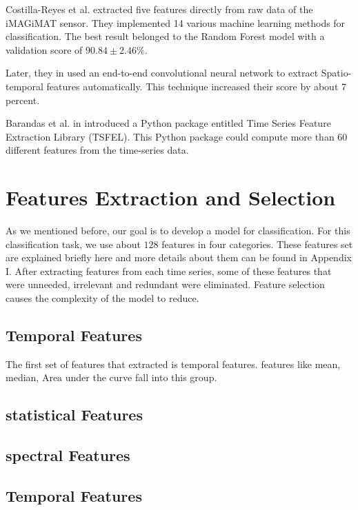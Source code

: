 Costilla-Reyes et al. \cite{Costilla-Reyes2016TemporalSystem} extracted five features directly from raw data of the iMAGiMAT sensor. They implemented 14 various machine learning methods for classification. The best result belonged to the Random Forest model with a validation score of $90.84 \pm 2.46\%$. 

Later, they in \cite{Costilla-Reyes2018DeepSensors} used an end-to-end convolutional neural network to extract Spatio-temporal features automatically. This technique increased their score by about 7 percent.

Barandas et al. in \cite{Barandas2020TSFEL:Library} introduced a Python package entitled Time Series Feature Extraction Library (TSFEL). This Python package could compute more than 60 different features from the time-series data.



\section{Features Extraction and Selection}

As we mentioned before, our goal is to develop a model for
classification. For this classification task, we use about $128$ features in four categories. These features set are explained briefly here and more details about them can be found in Appendix I. After extracting features from each time series, some of these features that were unneeded, irrelevant and redundant were eliminated. Feature selection causes the complexity of the model to reduce. 

\subsection{Temporal Features}
The first set of features that extracted is temporal features. features like mean, median, Area under the curve fall into this group. 


\subsection{statistical Features}


\subsection{spectral Features}


\subsection{Temporal Features}




